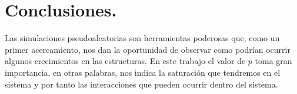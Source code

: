 \documentclass{article}
\begin{document}
\section{Conclusiones.}
 Las simulaciones pseudoaleatorias son herramientas poderosas que, como un primer acercamiento, nos dan la oportunidad de observar como podrían ocurrir algunos crecimientos en las estructuras. En este trabajo el valor de $p$ toma gran importancia, en otras palabras, nos indica la saturación que tendremos en el sistema y por tanto las interacciones que pueden ocurrir dentro del sistema.


\end{document}
